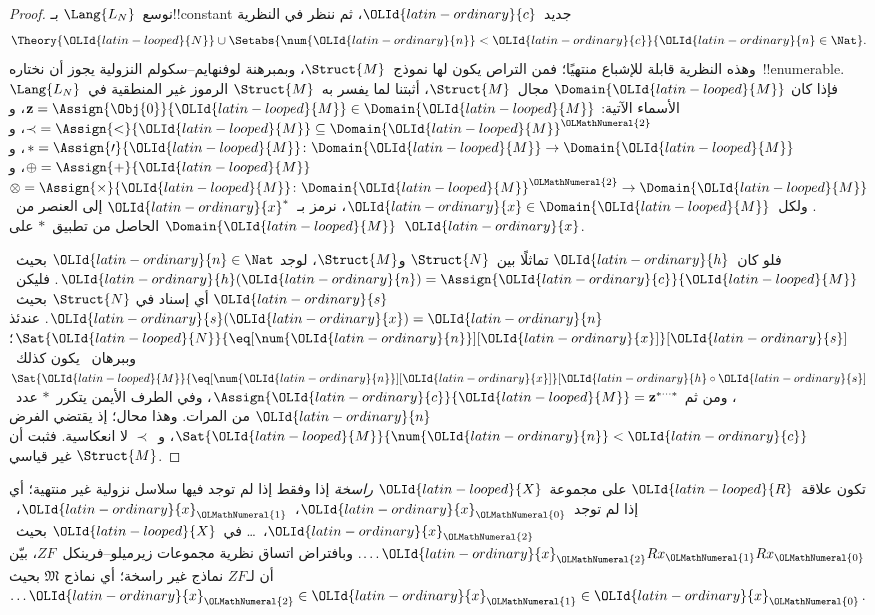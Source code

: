 \documentclass[../../../include/open-logic-section]{subfiles}
\begin{document}
\begin{proof}
نوسع~$\Lang{L_N}$ بـ!!{constant} جديد~$\OLId{latin-ordinary}{c}$، ثم ننظر في النظرية
\[
\Theory{\OLId{latin-looped}{N}} \cup \Setabs{\num{\OLId{latin-ordinary}{n}} < \OLId{latin-ordinary}{c}}{\OLId{latin-ordinary}{n} \in \Nat}.
\]
وهذه النظرية قابلة للإشباع منتهيًا؛ فمن التراص يكون لها نموذج~$\Struct{M}$،
وبمبرهنة لوفنهايم--سكولم النزولية يجوز أن نختاره~!!{enumerable}. فإذا كان
$\Domain{\OLId{latin-looped}{M}}$ مجال~$\Struct{M}$، أثبتنا لما يفسر به~$\Struct{M}$ الرموز
غير المنطقية في~$\Lang{L_N}$ الأسماء الآتية:
$\mathbf{z} = \Assign{\Obj{0}}{\OLId{latin-looped}{M}} \in \Domain{\OLId{latin-looped}{M}}$، و
${\prec} = \Assign{<}{\OLId{latin-looped}{M}} \subseteq \Domain{\OLId{latin-looped}{M}}^\OLMathNumeral{2}$، و
$* = \Assign{\prime}{\OLId{latin-looped}{M}} \colon \Domain{\OLId{latin-looped}{M}} \to \Domain{\OLId{latin-looped}{M}}$، و
$\oplus = \Assign{+}{\OLId{latin-looped}{M}}$، و
$\otimes = \Assign{\times}{\OLId{latin-looped}{M}} \colon \Domain{\OLId{latin-looped}{M}}^\OLMathNumeral{2} \to \Domain{\OLId{latin-looped}{M}}$.
ولكل~$\OLId{latin-ordinary}{x} \in \Domain{\OLId{latin-looped}{M}}$، نرمز بـ~$\OLId{latin-ordinary}{x}^*$ إلى العنصر من~$\Domain{\OLId{latin-looped}{M}}$
الحاصل من تطبيق~$*$ على~$\OLId{latin-ordinary}{x}$.

فلو كان~$\OLId{latin-ordinary}{h}$ تماثلًا بين~$\Struct{N}$ و$\Struct{M}$، لوجد
$\OLId{latin-ordinary}{n} \in \Nat$ بحيث~$\OLId{latin-ordinary}{h}(\OLId{latin-ordinary}{n}) = \Assign{\OLId{latin-ordinary}{c}}{\OLId{latin-looped}{M}}$. فليكن~$\OLId{latin-ordinary}{s}$ أي إسناد في
$\Struct{N}$ بحيث~$\OLId{latin-ordinary}{s}(\OLId{latin-ordinary}{x}) = \OLId{latin-ordinary}{n}$. عندئذ
$\Sat{\OLId{latin-looped}{N}}{\eq[\num{\OLId{latin-ordinary}{n}}][\OLId{latin-ordinary}{x}]}[\OLId{latin-ordinary}{s}]$؛ وببرهان~ يكون
كذلك~$\Sat{\OLId{latin-looped}{M}}{\eq[\num{\OLId{latin-ordinary}{n}}][\OLId{latin-ordinary}{x}]}[\OLId{latin-ordinary}{h} \circ \OLId{latin-ordinary}{s}]$، ومن ثم
$\Assign{\OLId{latin-ordinary}{c}}{\OLId{latin-looped}{M}} = \mathbf{z}^{*\cdots *}$، وفي الطرف الأيمن يتكرر~$*$ عدد~$\OLId{latin-ordinary}{n}$
من المرات. وهذا محال؛ إذ يقتضي الفرض
$\Sat{\OLId{latin-looped}{M}}{\num{\OLId{latin-ordinary}{n}} < \OLId{latin-ordinary}{c}}$، و~$\prec$ لا انعكاسية. فثبت أن
$\Struct{M}$ غير قياسي.
\end{proof}

\begin{prob}
تكون علاقة~$\OLId{latin-looped}{R}$ على مجموعة~$\OLId{latin-looped}{X}$ \emph{راسخة} إذا وفقط إذا لم توجد فيها
سلاسل نزولية غير منتهية؛ أي إذا لم توجد~$\OLId{latin-ordinary}{x}_\OLMathNumeral{0}$،~$\OLId{latin-ordinary}{x}_\OLMathNumeral{1}$،~$\OLId{latin-ordinary}{x}_\OLMathNumeral{2}$،~\dots
في~$\OLId{latin-looped}{X}$ بحيث~$\dots \OLId{latin-ordinary}{x}_\OLMathNumeral{2}Rx_\OLMathNumeral{1}Rx_\OLMathNumeral{0}$. وبافتراض اتساق نظرية مجموعات
زيرميلو--فرينكل~$ZF$، بيّن أن لـ$ZF$ نماذج غير راسخة؛ أي نماذج
$\mathfrak{M}$ بحيث~$\dots \OLId{latin-ordinary}{x}_\OLMathNumeral{2} \in \OLId{latin-ordinary}{x}_\OLMathNumeral{1} \in \OLId{latin-ordinary}{x}_\OLMathNumeral{0}$.
\end{prob}
\end{document}
